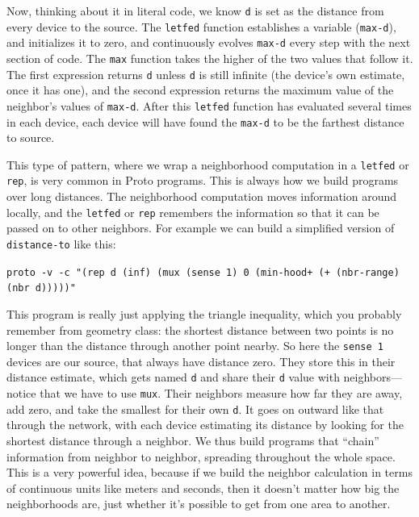\documentclass{article}
\newcommand\code[1]{\begin{center}\var{#1}\end{center}}
\newcommand\var[1]{{\tt #1}}
\begin{document}
Now, thinking about it in literal code, we know \var{d} is set as the
distance from every device to the source.  The \var{letfed} function
establishes a variable (\var{max-d}), and initializes it to zero, and
continuously evolves \var{max-d} every step with the next section of
code.  The \var{max} function takes the higher of the two values that
follow it.  The first expression returns \var{d} unless \var{d} is
still infinite (the device's own estimate, once it has one), and the
second expression returns the maximum value of the neighbor's values
of \var{max-d}.  After this \var{letfed} function has evaluated
several times in each device, each device will have found the
\var{max-d} to be the farthest distance to source.  

This type of pattern, where we wrap a neighborhood computation in a
\var{letfed} or \var{rep}, is very common in Proto programs.  This is
always how we build programs over long distances.  The neighborhood
computation moves information around locally, and the \var{letfed} or
\var{rep} remembers the information so that it can be passed on to
other neighbors.  For example we can build a simplified version of
\var{distance-to} like this:

\code{proto -v -c "(rep d (inf) (mux (sense 1) 0 (min-hood+ (+ (nbr-range) (nbr d)))))"}

This program is really just applying the triangle inequality, which
you probably remember from geometry class: the shortest distance
between two points is no longer than the distance through another
point nearby.  So here the \var{sense 1} devices are our source, that
always have distance zero.  They store this in their distance
estimate, which gets named \var{d} and share their \var{d} value with
neighbors---notice that we have to use \var{mux}.  Their neighbors
measure how far they are away, add zero, and take the smallest for
their own \var{d}.  It goes on outward like that through the network,
with each device estimating its distance by looking for the shortest
distance through a neighbor.  We thus build programs that ``chain''
information from neighbor to neighbor, spreading throughout the whole
space.  This is a very powerful idea, because if we build the neighbor
calculation in terms of continuous units like meters and seconds, then
it doesn't matter how big the neighborhoods are, just whether it's
possible to get from one area to another.
\end{document}
